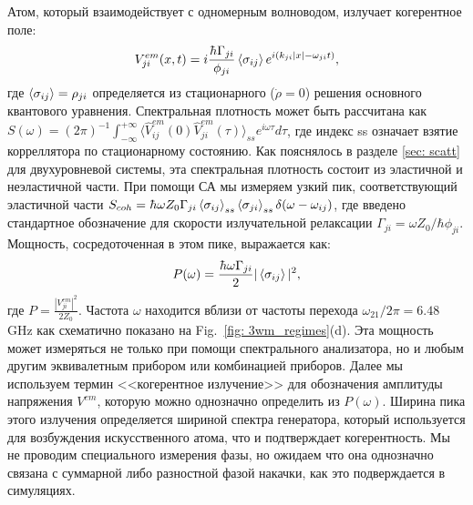 Атом, который взаимодействует с одномерным волноводом, излучает когерентное поле:
\begin{equation}
	V^{em}_{ji}(x,t)=i\frac{\hbar\Gamma_{ji}}{\phi_{ji}}\braket{\sigma_{ij}}e^{i (k_{ji}|x|-\omega_{ji}t)},
	\label{eq:V}
\end{equation}
где $\braket{\sigma_{ij}}=\rho_{ji}$ определяется из стационарного ($\dot{\rho}=0$) решения основного квантового уравнения. Спектральная плотность может быть рассчитана как $S(\omega) = (2\pi)^{-1}\int_{-\infty}^{+\infty}\langle\hat{V}^{em}_{ij}(0)\hat{V}_{ji}^{em}(\tau)\rangle_{ss}e^{i\omega \tau} d\tau$, где индекс ss означает взятие корреллятора по стационарному состоянию. Как пояснялось в разделе \ref{sec: scatt} для двухуровневой системы, эта спектральная плотность состоит из эластичной и неэластичной части. При помощи СА мы измеряем узкий пик, соответствующий эластичной части $S_{coh}=\hbar \omega Z_{0} \Gamma_{ji} \braket{\sigma_{ij}}_{ss} \braket{\sigma_{ji}}_{ss} \delta(\omega-\omega_{ij})$, где введено стандартное обозначение для скорости излучательной релаксации $\Gamma_{ji} = \omega Z_{0}/\hbar \phi_{ji}$. Мощность, сосредоточенная в этом пике, выражается как:
\begin{equation}
	P(\omega)=\frac{\hbar\omega\Gamma_{ji}}{2} |\braket{\sigma_{ij}}|^2,
\end{equation}
где $P=\frac{|V_{ji}^{em}|^2}{2Z_0}$. Частота $\omega$ находится вблизи от частоты перехода $\omega_{21}/ 2\pi=6.48$ GHz как схематично показано на Fig.~\ref{fig: 3wm_regimes}(d). Эта мощность может измеряться не только при помощи спектрального анализатора, но и любым другим эквивалетным прибором или комбинацией приборов. Далее мы используем термин <<когерентное излучение>> для обозначения амплитуды напряжения $V^{em}$, которую можно однозначно определить из $P(\omega)$. Ширина пика этого излучения определяется шириной спектра генератора, который используется для возбуждения искусственного атома, что и подтверждает когерентность. Мы не проводим специального измерения фазы, но ожидаем что она однозначно связана с суммарной либо разностной фазой накачки, как это подверждается в симуляциях. %

